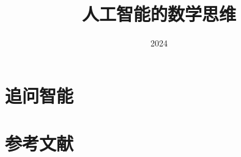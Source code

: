 \documentclass[lang=cn,scheme=chinese,12pt]{elegantbook}
\title{人工智能的数学思维}
\institute{华东师范大学 软件工程学院}
\date{2024}
\begin{document}
\maketitle


\frontmatter
\tableofcontents

\mainmatter   %


\part{追问智能}


%
%
%
%
%
% 
%
%


\part{参考文献}




\appendix                  %

%
 


\backmatter   
\end{document}
